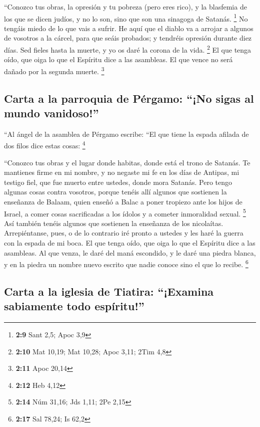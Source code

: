  ``Conozco tus obras, la opresión y tu pobreza (pero eres
rico), y la blasfemia de los que se dicen judíos, y no lo son, sino que
son una sinagoga de Satanás. \footnote{\textbf{2:9} Sant 2,5; Apoc 3,9}
 No tengáis miedo de lo que vais a sufrir. He aquí que el
diablo va a arrojar a algunos de vosotros a la cárcel, para que seáis
probados; y tendréis opresión durante diez días. Sed fieles hasta la
muerte, y yo os daré la corona de la vida. \footnote{\textbf{2:10} Mat
  10,19; Mat 10,28; Apoc 3,11; 2Tim 4,8}  El que tenga
oído, que oiga lo que el Espíritu dice a las asambleas. El que vence no
será dañado por la segunda muerte. \footnote{\textbf{2:11} Apoc 20,14}

\hypertarget{carta-a-la-parroquia-de-puxe9rgamo-no-sigas-al-mundo-vanidoso}{%
\subsection{Carta a la parroquia de Pérgamo: ``¡No sigas al mundo
vanidoso!''}\label{carta-a-la-parroquia-de-puxe9rgamo-no-sigas-al-mundo-vanidoso}}

 ``Al ángel de la asamblea de Pérgamo escribe: ``El que
tiene la espada afilada de dos filos dice estas cosas: \footnote{\textbf{2:12}
  Heb 4,12}

 ``Conozco tus obras y el lugar donde habitas, donde está
el trono de Satanás. Te mantienes firme en mi nombre, y no negaste mi fe
en los días de Antipas, mi testigo fiel, que fue muerto entre ustedes,
donde mora Satanás.  Pero tengo algunas cosas contra
vosotros, porque tenéis allí algunos que sostienen la enseñanza de
Balaam, quien enseñó a Balac a poner tropiezo ante los hijos de Israel,
a comer cosas sacrificadas a los ídolos y a cometer inmoralidad sexual.
\footnote{\textbf{2:14} Núm 31,16; Jds 1,11; 2Pe 2,15} 
Así también tenéis algunos que sostienen la enseñanza de los nicolaítas.
 Arrepiéntanse, pues, o de lo contrario iré pronto a
ustedes y les haré la guerra con la espada de mi boca. 
El que tenga oído, que oiga lo que el Espíritu dice a las asambleas. Al
que venza, le daré del maná escondido, y le daré una piedra blanca, y en
la piedra un nombre nuevo escrito que nadie conoce sino el que lo
recibe. \footnote{\textbf{2:17} Sal 78,24; Is 62,2}

\hypertarget{carta-a-la-iglesia-de-tiatira-examina-sabiamente-todo-espuxedritu}{%
\subsection{Carta a la iglesia de Tiatira: ``¡Examina sabiamente todo
espíritu!''}\label{carta-a-la-iglesia-de-tiatira-examina-sabiamente-todo-espuxedritu}}

